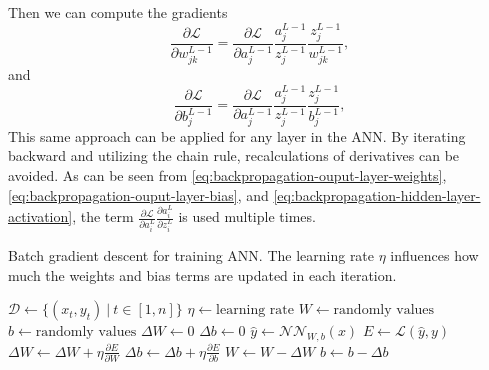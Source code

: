 Then we can compute the gradients
\begin{equation*}
    \frac{\partial \mathcal{L}}{\partial w_{jk}^{L-1}} = \frac{\partial \mathcal{L}}{\partial a_j^{L-1}} \frac{a_j^{L-1}}{z_j^{L-1}} \frac{z_j^{L-1}}{w_{jk}^{L-1}},
\end{equation*}
and
\begin{equation*}
    \frac{\partial \mathcal{L}}{\partial b_j^{L-1}} = \frac{\partial \mathcal{L}}{\partial a_j^{L-1}} \frac{a_j^{L-1}}{z_j^{L-1}} \frac{z_j^{L-1}}{b_j^{L-1}},
\end{equation*}
This same approach can be applied for any layer in the \gls{ANN}.
By iterating backward and utilizing the chain rule, recalculations of derivatives can be avoided.
As can be seen from \autoref{eq:backpropagation-ouput-layer-weights}, \autoref{eq:backpropagation-ouput-layer-bias}, and \autoref{eq:backpropagation-hidden-layer-activation}, the term $\frac{\partial\mathcal{L}}{\partial a_i^L} \frac{\partial a_i^L}{\partial z_i^L}$ is used multiple times.

\begin{algorithm}
    \caption{Batch gradient descent for training \gls{ANN}. The learning rate $\eta$ influences how much the weights and bias terms are updated in each iteration.}
    \label{alg:ann-training}
    \begin{algorithmic}
        \State $\mathcal{D} \gets \{(x_t, y_t)\ |\ t \in [1, n]\}$
        \State $\eta \gets \text{learning rate}$
        \State $W \gets \text{randomly values}$
        \State $b \gets \text{randomly values}$
            \State $\Delta W \gets 0$
            \State $\Delta b \gets 0$
                \State $\hat{y} \gets \mathcal{NN}_{W, b}(x)$
                \State $E \gets \mathcal{L}(\hat{y}, y)$
                \State $\Delta W \gets \Delta W + \eta \frac{\partial E}{\partial W}$
                \State $\Delta b \gets \Delta b + \eta \frac{\partial E}{\partial b}$
            \EndFor
            \State $W \gets W - \Delta W$
            \State $b \gets b - \Delta b$
        \EndWhile
    \end{algorithmic}
\end{algorithm}
